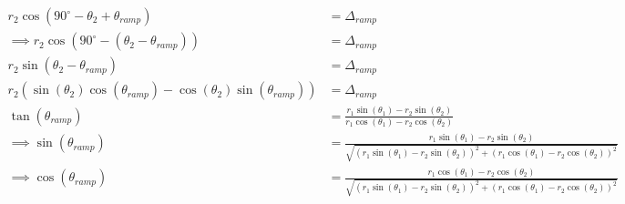\documentclass{article}
\begin{document}
	 \begin{align}
	 r_{2} \cos \left({90^{\circ} - \theta_{2} + \theta_{ramp}}\right) &= \Delta_{ramp} \\
	 \implies r_{2} \cos \left({90^{\circ} - \left(\theta_{2} - \theta_{ramp}\right)}\right) &= \Delta_{ramp} \\
	 r_{2} \sin \left({\theta_{2} - \theta_{ramp}}\right) &= \Delta_{ramp} \\
	 r_{2} \left(\sin \left({\theta_{2}}\right) \cos \left({\theta_{ramp}}\right) - \cos \left({\theta_{2}}\right) \sin \left({\theta_{ramp}}\right)\right) &= \Delta_{ramp} \\
	 \tan \left({\theta_{ramp}}\right) &= \frac{r_{1} \sin \left(\theta_{1}\right) - r_{2} \sin \left(\theta_{2}\right)}{r_{1} \cos \left(\theta_{1}\right) - r_{2} \cos \left(\theta_{2}\right)} \\
	 \implies \sin \left({\theta_{ramp}}\right) &= \frac{r_{1} \sin \left(\theta_{1}\right) - r_{2} \sin \left(\theta_{2}\right)}{\sqrt{\left(r_{1} \sin \left(\theta_{1}\right) - r_{2} \sin \left(\theta_{2}\right)\right)^{2} + \left(r_{1} \cos \left(\theta_{1}\right) - r_{2} \cos \left(\theta_{2}\right)\right)^{2}}} \\
	 \implies \cos \left({\theta_{ramp}}\right) &= \frac{r_{1} \cos \left(\theta_{1}\right) - r_{2} \cos \left(\theta_{2}\right)}{\sqrt{\left(r_{1} \sin \left(\theta_{1}\right) - r_{2} \sin \left(\theta_{2}\right)\right)^{2} + \left(r_{1} \cos \left(\theta_{1}\right) - r_{2} \cos \left(\theta_{2}\right)\right)^{2}}}
	 \end{align}
	 
\end{document}
